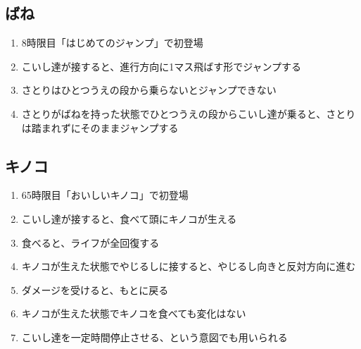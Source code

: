 \subsection{ばね}
\begin{enumerate}[label={\sarrow}]
\item 8時限目「はじめてのジャンプ」で初登場
\item こいし達が接すると、進行方向に1マス飛ばす形でジャンプする
\item さとりはひとつうえの段から乗らないとジャンプできない
\item さとりがばねを持った状態でひとつうえの段からこいし達が乗ると、さとりは踏まれずにそのままジャンプする
\end{enumerate}


\subsection{キノコ}
\begin{enumerate}[label={\sarrow}]
\item 65時限目「おいしいキノコ」で初登場
\item こいし達が接すると、食べて頭にキノコが生える
\item 食べると、ライフが全回復する
\item キノコが生えた状態でやじるしに接すると、やじるし向きと反対方向に進む
\item ダメージを受けると、もとに戻る
\item キノコが生えた状態でキノコを食べても変化はない
\item こいし達を一定時間停止させる、という意図でも用いられる
\end{enumerate}


\clearpage
